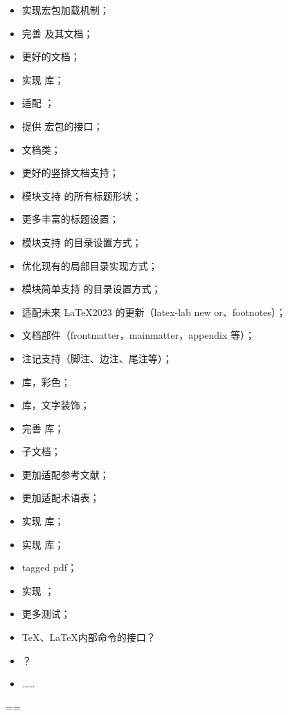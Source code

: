 \documentclass[twoside]{book}
\begin{document}
\begin{itemize}[label=\protect\raisebox{-.3ex}{\NDN}]
  \item 实现宏包加载机制；
  \item 完善  及其文档；
  \item 更好的文档；
  \item 实现  库；
  \item 适配 ；
  \item 提供  宏包的接口；
  \item {} 文档类；
  \item 更好的竖排文档支持；
  \item {} 模块支持  的所有标题形状；
  \item 更多丰富的标题设置；
  \item {} 模块支持  的目录设置方式；
  \item 优化现有的局部目录实现方式；
  \item {} 模块简单支持  的目录设置方式；
  \item 适配未来 \LaTeX 2023 的更新（latex-lab new or、footnotes）；
  \item 文档部件（frontmatter，mainmatter，appendix 等）；
  \item 注记支持（脚注、边注、尾注等）；
  \item {} 库，彩色；
  \item {} 库，文字装饰；
  \item 完善  库；
  \item 子文档；
  \item 更加适配参考文献；
  \item 更加适配术语表；
  \item 实现  库；
  \item 实现  库；
  \item tagged pdf；
  \item 实现 ；
  \item 更多测试；
  \item \TeX、\LaTeX 内部命令的接口？
  \item {}？
  \item ……
\end{itemize}



\cleardoublepage 
{}
  \vfuzz=\maxdimen \hfuzz=\maxdimen
\backmatter
\long\def\sectionmark#1{}
\long\def\chaptermark#1{\mark{{\noexpand\hyperlink{\UseName{@currentHref}}{索引}}{}}}
\end{document}
